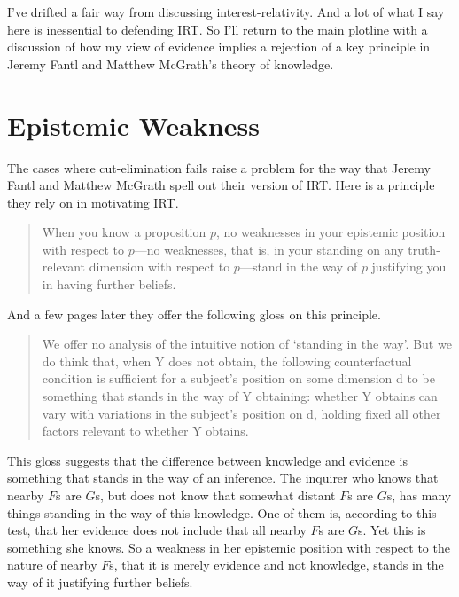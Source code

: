 \documentclass[11pt,]{book}
\begin{document}
I've drifted a fair way from discussing interest-relativity. And a lot of what I say here is inessential to defending IRT. So I'll return to the main plotline with a discussion of how my view of evidence implies a rejection of a key principle in Jeremy Fantl and Matthew McGrath's theory of knowledge.

\hypertarget{weakness}{%
\section{Epistemic Weakness}\label{weakness}}

The cases where cut-elimination fails raise a problem for the way that Jeremy Fantl and Matthew McGrath spell out their version of IRT. Here is a principle they rely on in motivating IRT.

\begin{quote}
When you know a proposition \(p\), no weaknesses in your epistemic position with respect to \(p\)---no weaknesses, that is, in your standing on any truth-relevant dimension with respect to \(p\)---stand in the way of \(p\) justifying you in having further beliefs. \citep[64]{FantlMcGrath2009}
\end{quote}

And a few pages later they offer the following gloss on this principle.

\begin{quote}
We offer no analysis of the intuitive notion of `standing in the way'. But we do think that, when Y does not obtain, the following counterfactual condition is sufficient for a subject's position on some dimension d to be something that stands in the way of Y obtaining: whether Y obtains can vary with variations in the subject's position on d, holding fixed all other factors relevant to whether Y obtains. \citep[67]{FantlMcGrath2009}
\end{quote}

This gloss suggests that the difference between knowledge and evidence is something that stands in the way of an inference. The inquirer who knows that nearby \(F\)s are \(G\)s, but does not know that somewhat distant \(F\)s are \(G\)s, has many things standing in the way of this knowledge. One of them is, according to this test, that her evidence does not include that all nearby \(F\)s are \(G\)s. Yet this is something she knows. So a weakness in her epistemic position with respect to the nature of nearby \(F\)s, that it is merely evidence and not knowledge, stands in the way of it justifying further beliefs.
\end{document}
